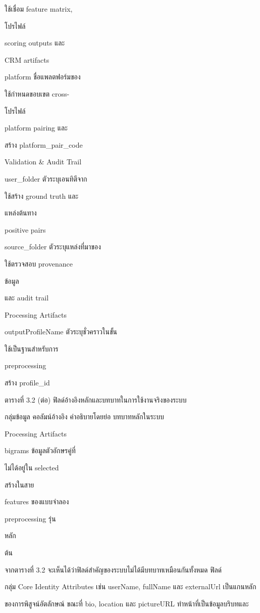 \documentclass[12pt,a4paper]{report}
\begin{document}
ใช้เชื่อม feature matrix,\par
โปรไฟล์\par
scoring outputs และ\par
CRM artifacts\par
platform ชื่อแพลตฟอร์มของ\par
ใช้กำหนดขอบเขต cross-\par
โปรไฟล์\par
platform pairing และ\par
สร้าง platform\_pair\_code\par
Validation \& Audit Trail\par
user\_folder ตัวระบุเอนทิตีจาก\par
ใช้สร้าง ground truth และ\par
แหล่งต้นทาง\par
positive pairs\par
source\_folder ตัวระบุแหล่งที่มาของ\par
ใช้ตรวจสอบ provenance\par
ข้อมูล\par
และ audit trail\par
Processing Artifacts\par
outputProfileName ตัวระบุชั่วคราวในขั้น\par
ใช้เป็นฐานสำหรับการ\par
preprocessing\par
สร้าง profile\_id\par
\clearpage
\begin{center}\small ตารางที่ 3.2 (ต่อ) ฟิลด์อ้างอิงหลักและบทบาทในการใช้งานจริงของระบบ\end{center}
กลุ่มข้อมูล คอลัมน์อ้างอิง คำอธิบายโดยย่อ บทบาทหลักในระบบ\par
Processing Artifacts\par
bigrams ข้อมูลตัวอักษรคู่ที่\par
ไม่ได้อยู่ใน selected\par
สร้างในสาย\par
features ของแบบจำลอง\par
preprocessing รุ่น\par
หลัก\par
ต้น\par
จากตารางที่ 3.2 จะเห็นได้ว่าฟิลด์สำคัญของระบบไม่ได้มีบทบาทเหมือนกันทั้งหมด ฟิลด์\par
กลุ่ม Core Identity Attributes เช่น userName, fullName และ externalUrl เป็นแกนหลัก\par
ของการพิสูจน์อัตลักษณ์ ขณะที่ bio, location และ pictureURL ทำหน้าที่เป็นข้อมูลบริบทและ\par
\end{document}

